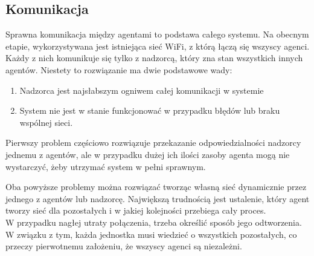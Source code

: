 \subsection{Komunikacja}

Sprawna komunikacja między agentami to podstawa całego systemu. Na obecnym etapie, wykorzystywana jest istniejąca sieć WiFi, z którą łączą się wszyscy agenci. Każdy z nich komunikuje się tylko z nadzorcą, który zna stan wszystkich innych agentów. Niestety to rozwiązanie ma dwie podstawowe wady:

\begin{enumerate}
    \item Nadzorca jest najsłabszym ogniwem całej komunikacji w systemie
    \item System nie jest w stanie funkcjonować w przypadku błędów lub braku wspólnej sieci.
\end{enumerate}

Pierwszy problem częściowo rozwiązuje przekazanie odpowiedzialności nadzorcy jednemu z agentów, ale w przypadku dużej ich ilości zasoby agenta mogą nie wystarczyć, żeby utrzymać system w pełni sprawnym.

Oba powyższe problemy można rozwiązać tworząc własną sieć dynamicznie przez jednego z agentów lub nadzorcę. Największą trudnością jest ustalenie, który agent tworzy sieć dla pozostałych i w jakiej kolejności przebiega cały proces.\\W przypadku nagłej utraty połączenia, trzeba określić sposób jego odtworzenia.\\W związku z tym, każda jednostka musi wiedzieć o wszystkich pozostałych, co przeczy pierwotnemu założeniu, że wszyscy agenci są niezależni.

%
